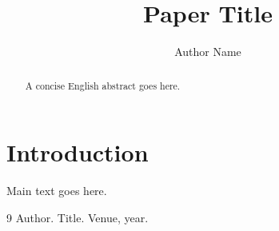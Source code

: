 \documentclass[11pt]{article}
\title{Paper Title}
\author{Author Name}
\date{}
\theoremstyle{definition}
\theoremstyle{remark}
\begin{document}
\maketitle

\begin{abstract}
A concise English abstract goes here.
\end{abstract}

\section{Introduction}
Main text goes here.

\begin{thebibliography}{9}
Author. Title. Venue, year.
\end{thebibliography}
\end{document}
